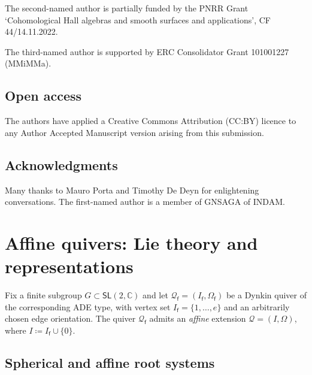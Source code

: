 \documentclass[reqno,a4paper]{amsart}
\newcommand{\C}{\mathbb{C}}
\newcommand{\sff}{\mathsf{f}}
\newcommand{\qv}{\mathcal{Q}}
\newcommand{\qvfin}{\mathcal{Q}_\sff}
\theoremstyle{basic-theorem}
\numberwithin{equation}{section}
\begin{document}
The second-named author is partially funded by the PNRR Grant `Cohomological Hall algebras and smooth surfaces and applications', CF 44/14.11.2022. 

The third-named author is supported by ERC Consolidator Grant 101001227 (MMiMMa).

\subsection*{Open access}

The authors have applied a Creative Commons Attribution (CC:BY) licence to any Author Accepted Manuscript version arising from this submission.

\subsection*{Acknowledgments}

Many thanks to Mauro Porta and Timothy De Deyn for enlightening conversations. The first-named author is a member of GNSAGA of INDAM.

\section{Affine quivers: Lie theory and representations}\label{sec:affine-quivers}

Fix a finite subgroup $G\subset \mathsf{SL}(2, \C)$ and let $\qvfin=(I_\sff, \Omega_\sff)$ be a Dynkin quiver of the corresponding ADE type, with vertex set $I_\sff=\{1, \ldots, e\}$ and an arbitrarily chosen edge orientation. The quiver $\qvfin$ admits an \textit{affine} extension $\qv=(I, \Omega)$, where $I\coloneqq I_\sff\cup \{0\}$.

\subsection{Spherical and affine root systems}\label{subsec:affine-quivers-roots-coweights}
\end{document}
